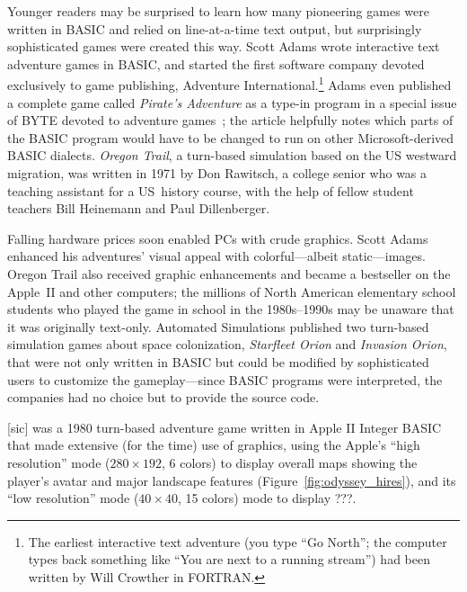 Younger readers may be surprised to learn how many pioneering games were
written in BASIC and relied on line-at-a-time text output, but
surprisingly sophisticated games were created this way.
Scott Adams wrote interactive text adventure games in BASIC, and started
the first software company devoted exclusively to game publishing,
Adventure International.\footnote{The earliest interactive text adventure (you type
``Go North''; the computer types back something like ``You are next to a
running stream'') had been written by Will Crowther in FORTRAN.}
Adams even published a complete game called \emph{Pirate's Adventure} as
a type-in program in a special issue of BYTE devoted to adventure
games~\cite{byte80:adventure}; the article helpfully notes which parts
of the BASIC program would have to be changed to run on other
Microsoft-derived BASIC dialects.
\emph{Oregon Trail}, a turn-based simulation based on the US westward
migration, was written in 1971 by Don Rawitsch, a college senior who was
a teaching assistant for a US~history course, with the help of
fellow student teachers Bill Heinemann and Paul Dillenberger.

Falling hardware prices soon enabled PCs with crude graphics.
Scott Adams enhanced his adventures' visual appeal with colorful---albeit
static---images.
Oregon Trail also received graphic enhancements and became
a bestseller on the Apple~II and other computers;
the millions of
North American elementary school students who played the game in school
in the 1980s--1990s
may be unaware that it was originally text-only.
Automated Simulations published two turn-based simulation games about
space colonization,
\emph{Starfleet Orion} and \emph{Invasion Orion}, that were not only
written in BASIC but could be modified by sophisticated users to
customize the gameplay---since BASIC programs were interpreted, the
companies had no choice but to provide the source code.

 [sic] was a 1980 turn-based adventure game
written in Apple II Integer BASIC
that made extensive (for the time) use of
graphics, using the Apple's ``high resolution'' mode ($280\times 192$, 6 colors)
to display overall maps showing the player's
avatar and major landscape features (Figure~\ref{fig:odyssey_hires}), and its
``low resolution'' mode ($40\times 40$, 15
colors) mode to display ???.

